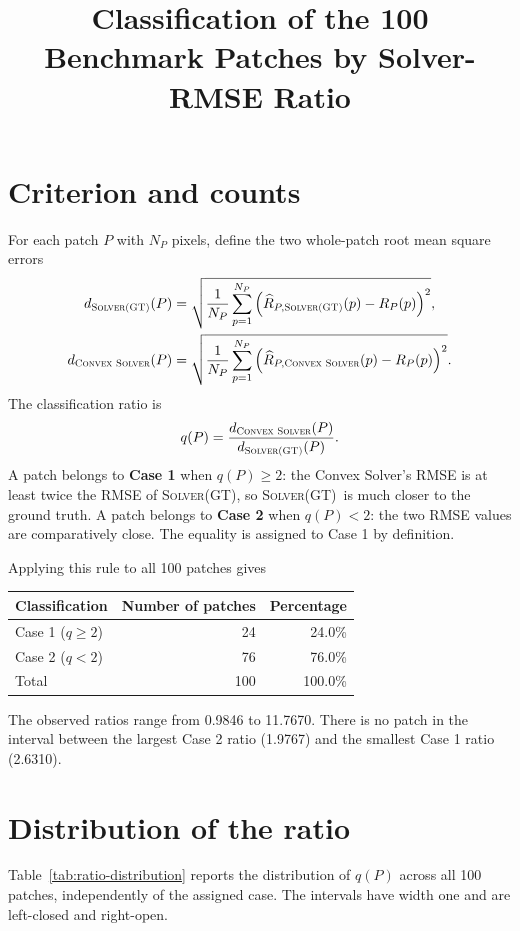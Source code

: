 \documentclass[11pt,a4paper]{article}
\title{Classification of the 100 Benchmark Patches by Solver-RMSE Ratio}
\author{}
\date{}
\newcommand{\solverGT}{\textsc{Solver(GT)}}
\newcommand{\solverConvex}{\textsc{Convex Solver}}
\begin{document}
\maketitle

\section{Criterion and counts}

For each patch $P$ with $N_P$ pixels, define the two whole-patch root mean square errors
\begin{align}
d_{\solverGT}(P)
  &= \sqrt{\frac{1}{N_P}\sum_{p=1}^{N_P}
      \left(\widehat{R}_{P,\solverGT}(p)-R_P(p)\right)^2},\\
d_{\solverConvex}(P)
  &= \sqrt{\frac{1}{N_P}\sum_{p=1}^{N_P}
      \left(\widehat{R}_{P,\solverConvex}(p)-R_P(p)\right)^2}.
\end{align}
The classification ratio is
\begin{equation}
q(P)=\frac{d_{\solverConvex}(P)}{d_{\solverGT}(P)}.
\end{equation}
A patch belongs to \textbf{Case 1} when $q(P)\geq 2$: the Convex Solver's RMSE is at least twice the RMSE of \solverGT, so \solverGT\ is much closer to the ground truth. A patch belongs to \textbf{Case 2} when $q(P)<2$: the two RMSE values are comparatively close. The equality is assigned to Case 1 by definition.

Applying this rule to all 100 patches gives
\begin{center}
\begin{tabular}{lrr}
\toprule
Classification & Number of patches & Percentage \\
\midrule
Case 1 ($q\geq 2$) & 24 & 24.0\% \\
Case 2 ($q<2$) & 76 & 76.0\% \\
\midrule
Total & 100 & 100.0\% \\
\bottomrule
\end{tabular}
\end{center}

The observed ratios range from 0.9846 to 11.7670. There is no patch in the interval between the largest Case 2 ratio (1.9767) and the smallest Case 1 ratio (2.6310).

\section{Distribution of the ratio}

Table~\ref{tab:ratio-distribution} reports the distribution of $q(P)$ across all 100 patches, independently of the assigned case. The intervals have width one and are left-closed and right-open.
\end{document}
